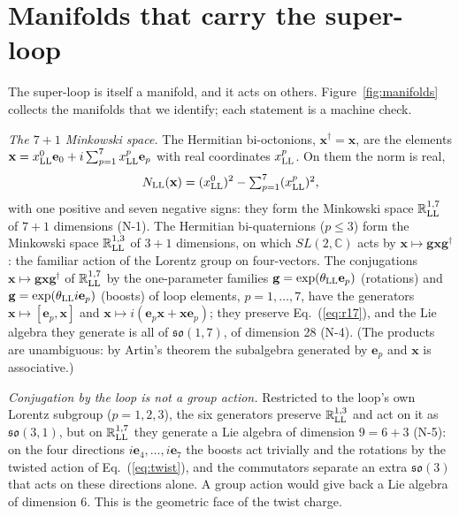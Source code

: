 \section{Manifolds that carry the super-loop}
\label{sec:manifolds}

The super-loop is itself a manifold, and it acts on others. Figure~\ref{fig:manifolds} collects the
manifolds that we identify; each statement is a machine check.

\emph{The $7+1$ Minkowski space.} The Hermitian bi-octonions, $\mathbf x^\dagger=\mathbf x$, are the
elements $\mathbf x=x^0_{\rm LL}\mathbf e_0+i\sum_{p=1}^7x^p_{\rm LL}\mathbf e_p$ with real coordinates
$x^p_{\rm LL}$. On them the norm is real,
\begin{equation}
N_{\rm LL}(\mathbf x)=(x^0_{\rm LL})^2-\textstyle\sum_{p=1}^7(x^p_{\rm LL})^2 ,
\label{eq:r17}
\end{equation}
with one positive and seven negative signs: they form the Minkowski space $\mathbb R^{1,7}_{\rm LL}$
of $7+1$ dimensions (N-1). The Hermitian bi-quaternions ($p\le3$) form the Minkowski space $\mathbb
R^{1,3}_{\rm LL}$ of $3+1$ dimensions, on which $SL(2,\mathbb C)$ acts by $\mathbf x\mapsto\mathbf
g\mathbf x\mathbf g^\dagger$: the familiar action of the Lorentz group on four-vectors. The
conjugations $\mathbf x\mapsto\mathbf g\mathbf x\mathbf g^\dagger$ of $\mathbb R^{1,7}_{\rm LL}$ by the
one-parameter families $\mathbf g=\exp(\theta_{\rm LL}\mathbf e_p)$ (rotations) and $\mathbf
g=\exp(\theta_{\rm LL}i\mathbf e_p)$ (boosts) of loop elements, $p=1,\dots,7$, have the generators
$\mathbf x\mapsto[\mathbf e_p,\mathbf x]$ and $\mathbf x\mapsto i(\mathbf e_p\mathbf x+\mathbf x\mathbf
e_p)$; they preserve Eq.~(\ref{eq:r17}), and the Lie algebra they generate is all of $\mathfrak{so}(1,7)$,
of dimension 28 (N-4). (The products are unambiguous: by Artin's theorem the subalgebra generated by
$\mathbf e_p$ and $\mathbf x$ is associative.)

\emph{Conjugation by the loop is not a group action.} Restricted to the loop's own Lorentz subgroup
($p=1,2,3$), the six generators preserve $\mathbb R^{1,3}_{\rm LL}$ and act on it as
$\mathfrak{so}(3,1)$, but on $\mathbb R^{1,7}_{\rm LL}$ they generate a Lie algebra of dimension
$9=6+3$ (N-5): on the four directions $i\mathbf e_4,\dots,i\mathbf e_7$ the boosts act trivially and the
rotations by the twisted action of Eq.~(\ref{eq:twist}), and the commutators separate an extra
$\mathfrak{so}(3)$ that acts on these directions alone. A group action would give back a Lie algebra of
dimension 6. This is the geometric face of the twist charge.

